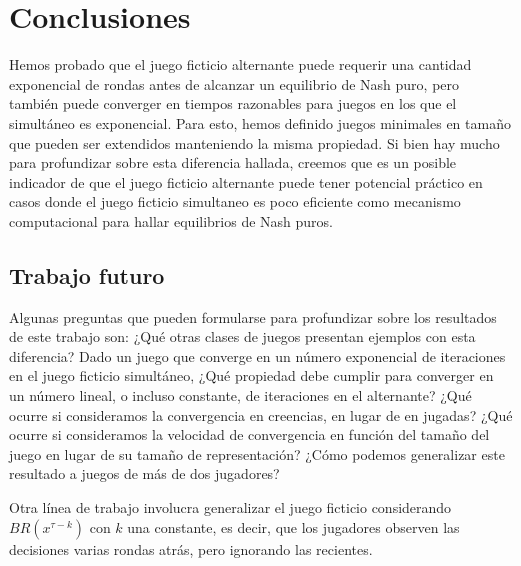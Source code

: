 \chapter{Conclusiones}  \label{cap:conclusiones} 

Hemos probado que el juego ficticio alternante puede requerir una cantidad exponencial de rondas antes de alcanzar un equilibrio de Nash puro, pero también puede converger en tiempos razonables para juegos en los que el simultáneo es exponencial. Para esto, hemos definido juegos minimales en tamaño que pueden ser extendidos manteniendo la misma propiedad.
Si bien hay mucho para profundizar sobre esta diferencia hallada, creemos que es un posible indicador de que el juego ficticio alternante puede tener potencial práctico en casos donde el juego ficticio simultaneo es poco eficiente como mecanismo computacional para hallar equilibrios de Nash puros.

\section{Trabajo futuro} 

Algunas preguntas que pueden formularse para profundizar sobre los resultados de este trabajo son: ¿Qué otras clases de juegos presentan ejemplos con esta diferencia? Dado un juego que converge en un número exponencial de iteraciones en el juego ficticio simultáneo, ¿Qué propiedad debe cumplir para converger en un número lineal, o incluso constante, de iteraciones en el alternante? ¿Qué ocurre si consideramos la convergencia en creencias, en lugar de en jugadas? ¿Qué ocurre si consideramos la velocidad de convergencia en función del tamaño del juego en lugar de su tamaño de representación? ¿Cómo podemos generalizar este resultado a juegos de más de dos jugadores?

Otra línea de trabajo involucra generalizar el juego ficticio considerando $BR(x^{\tau-k})$ con $k$ una constante, es decir, que los jugadores observen las decisiones varias rondas atrás, pero ignorando las recientes.